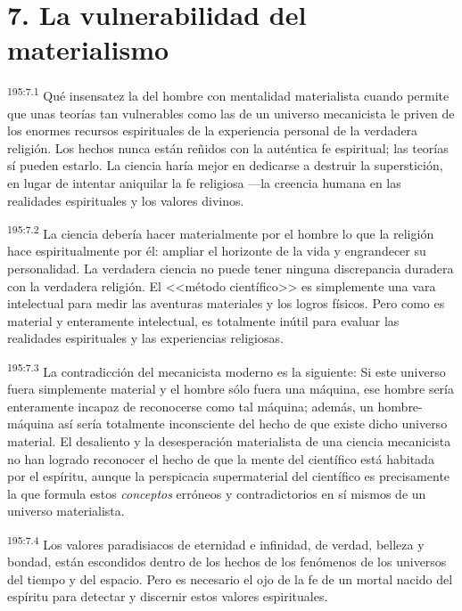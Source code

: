 \section*{7. La vulnerabilidad del materialismo}
\par 
\textsuperscript{195:7.1} Qué insensatez la del hombre con mentalidad materialista cuando permite que unas teorías tan vulnerables como las de un universo mecanicista le priven de los enormes recursos espirituales de la experiencia personal de la verdadera religión. Los hechos nunca están reñidos con la auténtica fe espiritual; las teorías sí pueden estarlo. La ciencia haría mejor en dedicarse a destruir la superstición, en lugar de intentar aniquilar la fe religiosa ---la creencia humana en las realidades espirituales y los valores divinos.

\par 
\textsuperscript{195:7.2} La ciencia debería hacer materialmente por el hombre lo que la religión hace espiritualmente por él: ampliar el horizonte de la vida y engrandecer su personalidad. La verdadera ciencia no puede tener ninguna discrepancia duradera con la verdadera religión. El <<método científico>> es simplemente una vara intelectual para medir las aventuras materiales y los logros físicos. Pero como es material y enteramente intelectual, es totalmente inútil para evaluar las realidades espirituales y las experiencias religiosas.

\par 
\textsuperscript{195:7.3} La contradicción del mecanicista moderno es la siguiente: Si este universo fuera simplemente material y el hombre sólo fuera una máquina, ese hombre sería enteramente incapaz de reconocerse como tal máquina; además, un hombre-máquina así sería totalmente inconsciente del hecho de que existe dicho universo material. El desaliento y la desesperación materialista de una ciencia mecanicista no han logrado reconocer el hecho de que la mente del científico está habitada por el espíritu, aunque la perspicacia supermaterial del científico es precisamente la que formula estos \textit{conceptos} erróneos y contradictorios en sí mismos de un universo materialista.

\par 
\textsuperscript{195:7.4} Los valores paradisiacos de eternidad e infinidad, de verdad, belleza y bondad, están escondidos dentro de los hechos de los fenómenos de los universos del tiempo y del espacio. Pero es necesario el ojo de la fe de un mortal nacido del espíritu para detectar y discernir estos valores espirituales.

